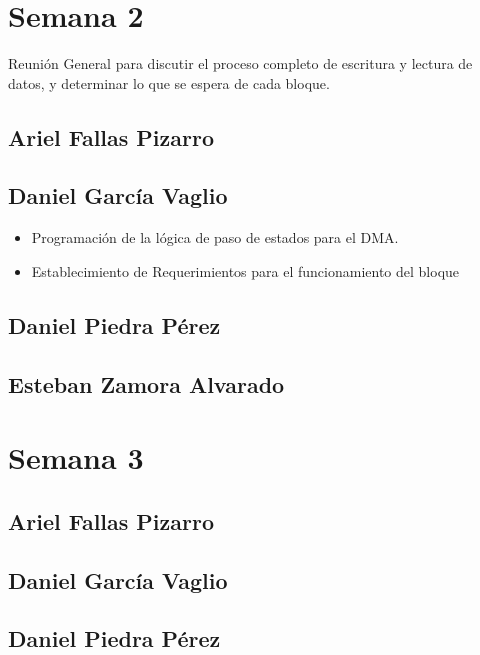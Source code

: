 \newpage
\section{Semana 2}

Reunión General para discutir el proceso completo de escritura y lectura de datos, y determinar lo
que se espera de cada bloque. 
\subsection{Ariel Fallas Pizarro}


\subsection{Daniel García Vaglio}
\begin{itemize}
\item Programación de la lógica de paso de estados para el DMA.
\item Establecimiento de Requerimientos para el funcionamiento del bloque
\end{itemize}


\subsection{Daniel Piedra Pérez}


\subsection{Esteban Zamora Alvarado}

\newpage
\section{Semana 3}
\subsection{Ariel Fallas Pizarro}


\subsection{Daniel García Vaglio}


\subsection{Daniel Piedra Pérez}


